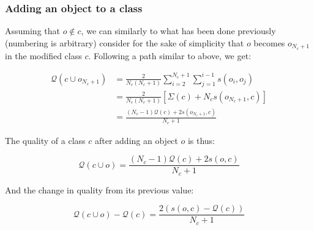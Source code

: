 \documentclass[natbib,smallextended]{svjour3}
\begin{document}
\subsubsection{Adding an object to a class}

Assuming that $o \notin c$, we can similarly to what has been done previously (numbering is arbitrary) consider for the sake of simplicity that $o$ becomes $o_{N_c+1}$ in the modified class $c$. Following a path similar to above, we get:

\begin{equation*}
  \begin{aligned}
    \mathcal{Q}(c \cup o_{N_c+1}) & = \frac{2}{N_c(N_c+1)} \sum_{i=2}^{N_c+1} \sum_{j=1}^{i-1} s\left(o_i, o_j\right) \\
                                & = \frac{2}{N_c(N_c+1)} \left[\Sigma(c) + N_c s\left(o_{N_c+1}, c\right)\right] \\
                                & = \frac{(N_c-1) \mathcal{Q}(c)  + 2s\left(o_{N_c+1}, c\right)}{N_c+1}
  \end{aligned}
\end{equation*}

\noindent The quality of a class $c$ after adding an object $o$ is thus:

\begin{equation}
  \mathcal{Q}\left(c \cup o\right) = \frac{(N_c-1) \mathcal{Q}(c)  + 2s\left(o, c\right)}{N_c+1}
  \label{eq:newQual_add}
\end{equation}

\noindent And the change in quality from its previous value:

\begin{equation} \label{deltaAdd}
    \mathcal{Q}\left(c \cup o\right) - \mathcal{Q}\left(c\right)  = \frac{2\left(s\left(o, c\right)-\mathcal{Q}(c)\right)}{N_c+1}
\end{equation}

\end{document}

